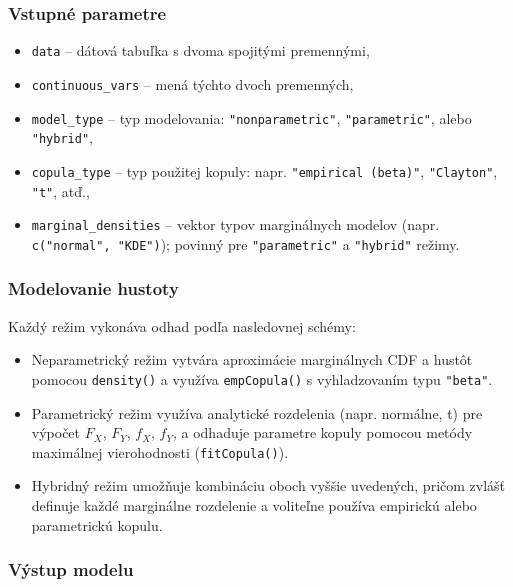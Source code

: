 \subsubsection{Vstupné parametre}

\begin{itemize}
\setlength{\itemsep}{0pt}
  \setlength{\parskip}{0pt}
  \item \texttt{data} – dátová tabuľka s dvoma spojitými premennými,
  \item \texttt{continuous\_vars} – mená týchto dvoch premenných,
  \item \texttt{model\_type} – typ modelovania: \texttt{"nonparametric"}, \texttt{"parametric"}, alebo \texttt{"hybrid"},
  \item \texttt{copula\_type} – typ použitej kopuly: napr. \texttt{"}\texttt{empirical (beta)"}, \texttt{"Clayton"}, \texttt{"t"}, atď.,
  \item \texttt{marginal\_densities} – vektor typov marginálnych modelov (napr. \texttt{c("normal", "KDE")}); povinný pre \texttt{"parametric"} a \texttt{"hybrid"} režimy.
\end{itemize}

\subsubsection{Modelovanie hustoty}

Každý režim vykonáva odhad podľa nasledovnej schémy:

\begin{itemize}
\setlength{\itemsep}{0pt}
  \setlength{\parskip}{0pt}
  \item Neparametrický režim vytvára aproximácie marginálnych CDF a hustôt pomocou \texttt{density()} a využíva \texttt{empCopula()} s vyhladzovaním typu \texttt{"beta"}.
  \item Parametrický režim využíva analytické rozdelenia (napr. normálne, t) pre výpočet $F_X$, $F_Y$, $f_X$, $f_Y$, a odhaduje parametre kopuly pomocou metódy maximálnej vierohodnosti (\texttt{fitCopula()}).
  \item Hybridný režim umožňuje kombináciu oboch vyššie uvedených, pričom zvlášť definuje každé marginálne rozdelenie a voliteľne používa empirickú alebo parametrickú kopulu.
\end{itemize}

\subsubsection{Výstup modelu}


